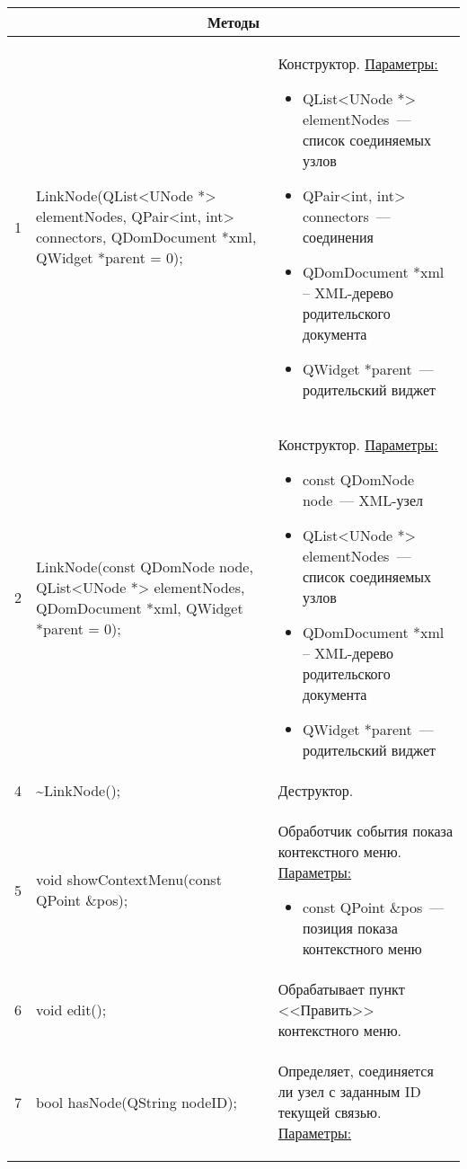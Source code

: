 \begin{longtable}[h]{|p{}|p{}|p{}|}
  \multicolumn{3}{|c|}{\textbf{Методы}} \\
  \hline
  1 & LinkNode(QList<UNode *> elementNodes, QPair<int, int> connectors, QDomDocument *xml, QWidget *parent = 0); &
    Конструктор.\newline
    \uline{Параметры:}
    \begin{itemize}[nolistsep,label=,leftmargin=0cm]
      \item QList<UNode *> elementNodes~--- список соединяемых узлов
      \item QPair<int, int> connectors~--- соединения
      \item QDomDocument *xml -- XML-дерево родительского документа
      \item QWidget *parent~--- родительский виджет
    \end{itemize}\\ \hline
  2 & LinkNode(const QDomNode node, QList<UNode *> elementNodes, QDomDocument *xml, QWidget *parent = 0); &
    Конструктор.\newline
    \uline{Параметры:}
    \begin{itemize}[nolistsep,label=,leftmargin=0cm]
      \item const QDomNode node~--- XML-узел
      \item QList<UNode *> elementNodes~--- список соединяемых узлов
      \item QDomDocument *xml -- XML-дерево родительского документа
      \item QWidget *parent~--- родительский виджет
    \end{itemize}\\ \hline
  4 & \textasciitilde LinkNode(); & Деструктор. \\ \hline
  5 & void showContextMenu(const QPoint \&pos); & Обработчик события показа контекстного меню.\newline
    \uline{Параметры:}
    \begin{itemize}[nolistsep,label=,leftmargin=0cm]
      \item const QPoint \&pos~--- позиция показа контекстного меню
    \end{itemize}\\ \hline
  6 & void edit(); & Обрабатывает пункт <<Править>> контекстного меню.\\ \hline
  7 & bool hasNode(QString nodeID); & Определяет, соединяется ли узел с заданным ID текущей связью.\newline
    \uline{Параметры:}
    \begin{itemize}[nolistsep,label=,leftmargin=0cm]

\end{itemize}
\end{longtable}
